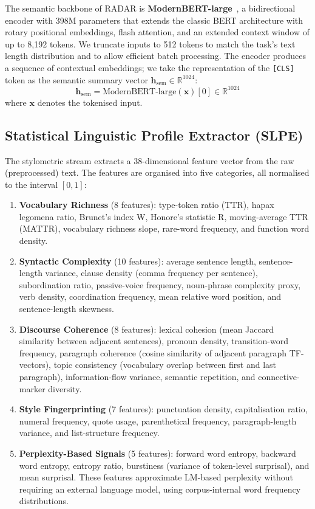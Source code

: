 \documentclass[]{ceurart}
\begin{document}
The semantic backbone of RADAR is \textbf{ModernBERT-large}~\cite{modernbert:2024}, a bidirectional encoder with 398M parameters that extends the classic BERT architecture with rotary positional embeddings, flash attention, and an extended context window of up to 8,192 tokens. We truncate inputs to 512 tokens to match the task's text length distribution and to allow efficient batch processing. The encoder produces a sequence of contextual embeddings; we take the representation of the \texttt{[CLS]} token as the semantic summary vector $\mathbf{h}_\text{sem} \in \mathbb{R}^{1024}$:
\begin{equation}
  \mathbf{h}_\text{sem} = \text{ModernBERT-large}(\mathbf{x})[0] \in \mathbb{R}^{1024}
\end{equation}
where $\mathbf{x}$ denotes the tokenised input.

\subsection{Statistical Linguistic Profile Extractor (SLPE)}

The stylometric stream extracts a 38-dimensional feature vector from the raw (preprocessed) text. The features are organised into five categories, all normalised to the interval $[0,1]$:

\begin{enumerate}
  \item \textbf{Vocabulary Richness} (8 features): type-token ratio (TTR), hapax legomena ratio, Brunet's index W, Honore's statistic R, moving-average TTR (MATTR), vocabulary richness slope, rare-word frequency, and function word density.
  \item \textbf{Syntactic Complexity} (10 features): average sentence length, sentence-length variance, clause density (comma frequency per sentence), subordination ratio, passive-voice frequency, noun-phrase complexity proxy, verb density, coordination frequency, mean relative word position, and sentence-length skewness.
  \item \textbf{Discourse Coherence} (8 features): lexical cohesion (mean Jaccard similarity between adjacent sentences), pronoun density, transition-word frequency, paragraph coherence (cosine similarity of adjacent paragraph TF-vectors), topic consistency (vocabulary overlap between first and last paragraph), information-flow variance, semantic repetition, and connective-marker diversity.
  \item \textbf{Style Fingerprinting} (7 features): punctuation density, capitalisation ratio, numeral frequency, quote usage, parenthetical frequency, paragraph-length variance, and list-structure frequency.
  \item \textbf{Perplexity-Based Signals} (5 features): forward word entropy, backward word entropy, entropy ratio, burstiness (variance of token-level surprisal), and mean surprisal. These features approximate LM-based perplexity without requiring an external language model, using corpus-internal word frequency distributions.
\end{enumerate}
\end{document}
